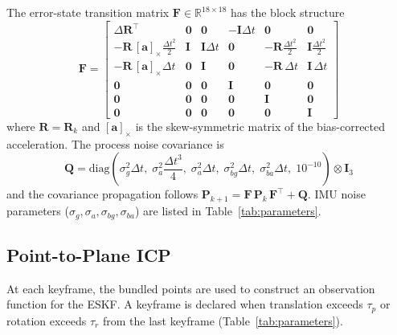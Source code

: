 The error-state transition matrix $\mathbf{F} \in \mathbb{R}^{18 \times 18}$ has the block structure
\begin{equation}
    \mathbf{F} = \begin{bmatrix}
        \Delta\mathbf{R}^\top & \mathbf{0} & \mathbf{0} & -\mathbf{I}\Delta t & \mathbf{0} & \mathbf{0} \\
        -\mathbf{R}\,[\mathbf{a}]_\times \frac{\Delta t^2}{2} & \mathbf{I} & \mathbf{I}\Delta t & \mathbf{0} & -\mathbf{R}\frac{\Delta t^2}{2} & \mathbf{I}\frac{\Delta t^2}{2} \\[3pt]
        -\mathbf{R}\,[\mathbf{a}]_\times \Delta t & \mathbf{0} & \mathbf{I} & \mathbf{0} & -\mathbf{R}\,\Delta t & \mathbf{I}\,\Delta t \\
        \mathbf{0} & \mathbf{0} & \mathbf{0} & \mathbf{I} & \mathbf{0} & \mathbf{0} \\
        \mathbf{0} & \mathbf{0} & \mathbf{0} & \mathbf{0} & \mathbf{I} & \mathbf{0} \\
        \mathbf{0} & \mathbf{0} & \mathbf{0} & \mathbf{0} & \mathbf{0} & \mathbf{I}
    \end{bmatrix}
    \label{eq:F_matrix}
\end{equation}
where $\mathbf{R} = \mathbf{R}_k$ and $[\mathbf{a}]_\times$ is the skew-symmetric matrix of the bias-corrected acceleration.
The process noise covariance is
\begin{equation}
    \mathbf{Q} = \mathrm{diag}\!\left(
        \sigma_g^2\Delta t,\;
        \sigma_a^2\frac{\Delta t^3}{4},\;
        \sigma_a^2\Delta t,\;
        \sigma_{bg}^2\Delta t,\;
        \sigma_{ba}^2\Delta t,\;
        10^{-10}
    \right) \otimes \mathbf{I}_3
    \label{eq:Q_matrix}
\end{equation}
and the covariance propagation follows $\mathbf{P}_{k+1} = \mathbf{F}\,\mathbf{P}_k\,\mathbf{F}^\top + \mathbf{Q}$.
IMU noise parameters ($\sigma_g, \sigma_a, \sigma_{bg}, \sigma_{ba}$) are listed in Table~\ref{tab:parameters}.

\subsection{Point-to-Plane ICP}
\label{sec:icp}

At each keyframe, the bundled points are used to construct an observation function for the ESKF.
A keyframe is declared when translation exceeds $\tau_p$ or rotation exceeds $\tau_r$ from the last keyframe (Table~\ref{tab:parameters}).

